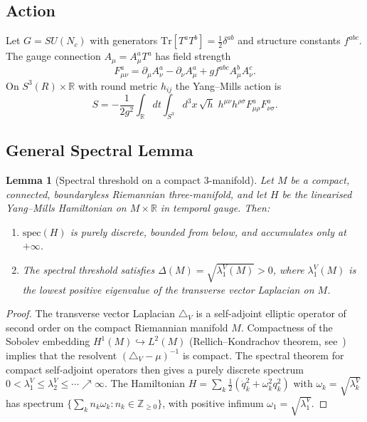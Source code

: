 \documentclass[
  aps,
  prd,
  reprint,
  superscriptaddress,
  nofootinbib,
  longbibliography,
  amsmath,
  amssymb
]{revtex4-2}
\theoremstyle{plain}
\newtheorem{lemma}[theorem]{Lemma}
\theoremstyle{definition}
\theoremstyle{remark}
\newcommand{\SU}[1]{SU(#1)}
\newcommand{\half}{\tfrac{1}{2}}
\newcommand{\tr}{\mathrm{Tr}}
\begin{document}
\subsection{Action}

Let $G=\SU{N_c}$ with generators $\tr[T^aT^b]=\half\delta^{ab}$
and structure constants $f^{abc}$.
The gauge connection $A_\mu = A_\mu^a T^a$ has field strength
\begin{equation}
  F_{\mu\nu}^a = \partial_\mu A_\nu^a-\partial_\nu A_\mu^a
    +gf^{abc}A_\mu^b A_\nu^c.
  \label{eq:fmunu}
\end{equation}
On $S^3(R)\times\mathbb{R}$ with round metric $h_{ij}$ the
Yang--Mills action is
\begin{equation}
  S = -\frac{1}{2g^2}\int_\mathbb{R}\!dt\int_{S^3}\!d^3x\,\sqrt{h}\;
    h^{\mu\nu}h^{\rho\sigma}F_{\mu\rho}^aF_{\nu\sigma}^a.
  \label{eq:action}
\end{equation}

\subsection{General Spectral Lemma}

\begin{lemma}[Spectral threshold on a compact 3-manifold]
  \label{lem:general}
  Let $M$ be a compact, connected, boundaryless Riemannian
  three-manifold, and let $H$ be the linearised Yang--Mills
  Hamiltonian on $M\times\mathbb{R}$ in temporal gauge. Then:
  \begin{enumerate}[label=\textup{(\roman*)}]
  \item $\mathrm{spec}(H)$ is purely discrete, bounded from below,
    and accumulates only at $+\infty$.
  \item The spectral threshold satisfies
    $\Delta(M) = \sqrt{\lambda_1^V(M)} > 0$,
    where $\lambda_1^V(M)$ is the lowest positive eigenvalue of
    the transverse vector Laplacian on $M$.
  \end{enumerate}
\end{lemma}

\begin{proof}
  The transverse vector Laplacian $\triangle_V$ is a self-adjoint
  elliptic operator of second order on the compact Riemannian manifold
  $M$. Compactness of the Sobolev embedding $H^1(M)\hookrightarrow L^2(M)$
  (Rellich--Kondrachov theorem, see~\cite{Taylor1996,Gilkey1995}) implies
  that the resolvent $(\triangle_V-\mu)^{-1}$ is compact. The spectral
  theorem for compact self-adjoint operators then gives a purely discrete
  spectrum $0<\lambda_1^V\leq\lambda_2^V\leq\cdots\nearrow\infty$.
  The Hamiltonian $H=\sum_k\half(\dot q_k^2+\omega_k^2 q_k^2)$ with
  $\omega_k=\sqrt{\lambda_k^V}$ has spectrum
  $\{\sum_k n_k\omega_k: n_k\in\mathbb{Z}_{\geq0}\}$, with positive
  infimum $\omega_1=\sqrt{\lambda_1^V}$.
\end{proof}
\end{document}
